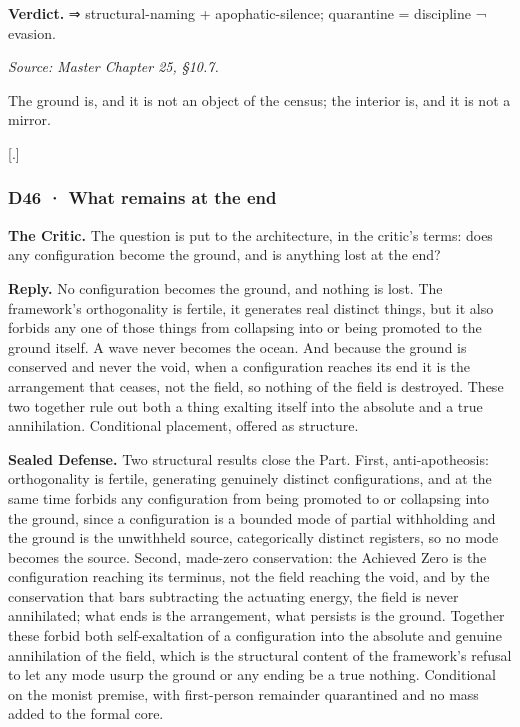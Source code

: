 \documentclass[10pt,twocolumn]{article}
\begin{document}
\textbf{Verdict.} ⇒ structural-naming + apophatic-silence; quarantine =
discipline ¬ evasion.

\emph{Source: Master Chapter 25, §10.7.}

The ground is, and it is not an object of the census; the interior is,
and it is not a mirror.

{[}.{]}

\hypertarget{d46-what-remains-at-the-end}{%
\subsubsection{D46 · What remains at the
end}\label{d46-what-remains-at-the-end}}

\textbf{The Critic.} The question is put to the architecture, in the
critic's terms: does any configuration become the ground, and is
anything lost at the end?

\textbf{Reply.} No configuration becomes the ground, and nothing is
lost. The framework's orthogonality is fertile, it generates real
distinct things, but it also forbids any one of those things from
collapsing into or being promoted to the ground itself. A wave never
becomes the ocean. And because the ground is conserved and never the
void, when a configuration reaches its end it is the arrangement that
ceases, not the field, so nothing of the field is destroyed. These two
together rule out both a thing exalting itself into the absolute and a
true annihilation. Conditional placement, offered as structure.

\textbf{Sealed Defense.} Two structural results close the Part. First,
anti-apotheosis: orthogonality is fertile, generating genuinely distinct
configurations, and at the same time forbids any configuration from
being promoted to or collapsing into the ground, since a configuration
is a bounded mode of partial withholding and the ground is the
unwithheld source, categorically distinct registers, so no mode becomes
the source. Second, made-zero conservation: the Achieved Zero is the
configuration reaching its terminus, not the field reaching the void,
and by the conservation that bars subtracting the actuating energy, the
field is never annihilated; what ends is the arrangement, what persists
is the ground. Together these forbid both self-exaltation of a
configuration into the absolute and genuine annihilation of the field,
which is the structural content of the framework's refusal to let any
mode usurp the ground or any ending be a true nothing. Conditional on
the monist premise, with first-person remainder quarantined and no mass
added to the formal core.
\end{document}
